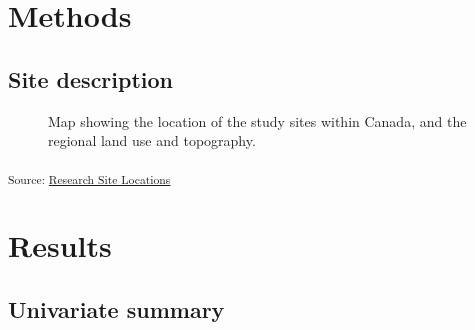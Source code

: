 \documentclass[
  number]{elsarticle}
\begin{document}
\section{Methods}\label{methods}

\subsection{Site description}\label{site-description}

\begin{figure}[H]


\caption{\label{fig-location_map}Map showing the location of the study
sites within Canada, and the regional land use and topography.}

\end{figure}%

\textsubscript{Source:
\href{https://alex-koiter.github.io/spatial-variability-soil-manuscript/notebooks/location_map.qmd.html\#cell-fig-location_map}{Research
Site Locations}}

\section{Results}\label{results}

\subsection{Univariate summary}\label{univariate-summary}
\end{document}
